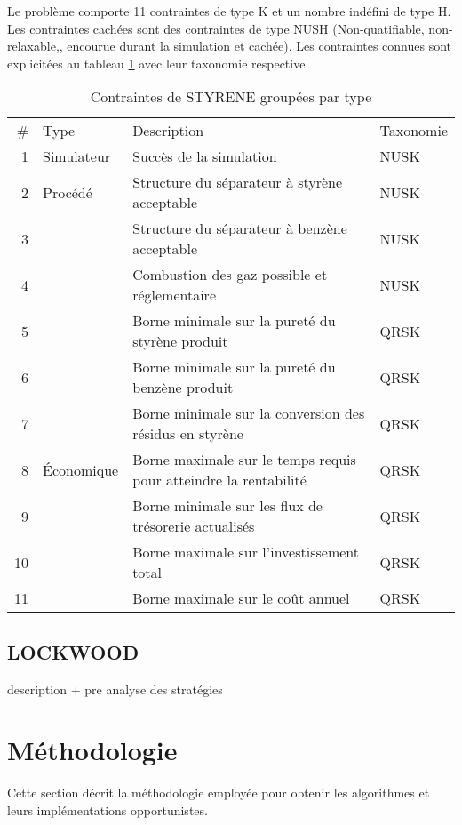 Le problème comporte 11 contraintes de type \textsf{K} et un nombre indéfini de type \textsf{H}. Les contraintes cachées sont des contraintes de type \textsf{NUSH} (Non-quatifiable, non-relaxable,, encourue durant la simulation et cachée). Les contraintes connues sont explicitées au tableau \ref{tab:sty} avec leur taxonomie respective.
\begin{table}[h]
\centering
\begin{tabular}{||r l l l||}
\hline
\# & Type & Description & Taxonomie\\
\hhline{||====||}
1 & Simulateur & Succès de la simulation & \textsf{NUSK}\\
2 & Procédé & Structure du séparateur à styrène acceptable & \textsf{NUSK}\\
3 & ~ & Structure du séparateur à benzène acceptable & \textsf{NUSK}\\
4 & ~ & Combustion des gaz possible et réglementaire & \textsf{NUSK}\\
5 & ~ & Borne minimale sur la pureté du styrène produit & \textsf{QRSK}\\
6 & ~ & Borne minimale sur la pureté du benzène produit & \textsf{QRSK}\\
7 & ~ & Borne minimale sur la conversion des résidus en styrène & \textsf{QRSK}\\	
8 & Économique & Borne maximale sur le temps requis pour atteindre la rentabilité & \textsf{QRSK}\\	
9 & ~ & Borne minimale sur les flux de trésorerie actualisés & \textsf{QRSK}\\
10 & ~ & Borne maximale sur l'investissement total & \textsf{QRSK}\\
11 & ~ & Borne maximale sur le coût annuel & \textsf{QRSK}\\
\hline
\end{tabular}
\caption{Contraintes de STYRENE groupées par type}\label{tab:sty}
\end{table}
\subsection{LOCKWOOD}\label{sec:loc}
description + pre analyse des stratégies
\section{Méthodologie}\label{sec:met}
Cette section décrit la méthodologie employée pour obtenir les algorithmes et leurs implémentations opportunistes.
